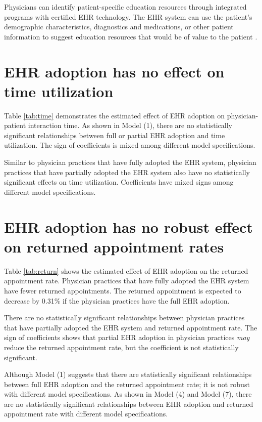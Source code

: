 \documentclass[12pt]{report}
\begin{document}
Physicians can identify patient-specific education resources through integrated programs with certified EHR technology. The EHR system can use the patient's demographic characteristics, diagnostics and medications, or other patient information to suggest education resources that would be of value to the patient \citep{hitrc_edu}. 

\section{EHR adoption has no effect on time utilization}
Table \ref{tab:time} demonstrates the estimated effect of EHR adoption on physician-patient interaction time. As shown in Model (1), there are no statistically significant relationships between full or partial EHR adoption and time utilization. The sign of coefficients is mixed among different model specifications.

Similar to physician practices that have fully adopted the EHR system, physician practices that have partially adopted the EHR system also have no statistically significant effects on time utilization. Coefficients have mixed signs among different model specifications.



\section{EHR adoption has no robust effect on returned appointment rates}

Table \ref{tab:return} shows the estimated effect of EHR adoption on the returned appointment rate. Physician practices that have fully adopted the EHR system have fewer returned appointments. The returned appointment is expected to decrease by 0.31\% if the physician practices have the full EHR adoption. 

There are no statistically significant relationships between physician practices that have partially adopted the EHR system and returned appointment rate. The sign of coefficients shows that partial EHR adoption in physician practices \textit{may} reduce the returned appointment rate, but the coefficient is not statistically significant.

Although Model (1) suggests that there are statistically significant relationships between full EHR adoption and the returned appointment rate; it is not robust with different model specifications.  As shown in Model (4) and Model (7), there are no statistically significant relationships between EHR adoption and returned appointment rate with different model specifications.
\end{document}
